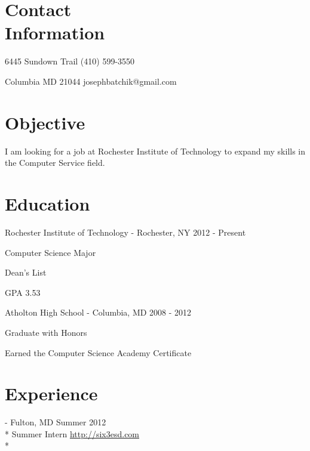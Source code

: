 \documentclass[a4paper,margin,line,11pt]{resume}
\newcommand{\rurl}[1]{\hfill {\footnotesize \url{#1}}}
\newcommand{\rdate}[1]{\hfill {\small #1}}
\renewcommand{\employer}[5]{\item[#1] - #2 \rdate{#3} \\* #4 \rurl{#5} \\*}
\begin{document}
\begin{resume}
\section{\mysidestyle Contact \\ Information} \vspace{2mm}
	\begin{asparablank}
		\item 6445 Sundown Trail \hfill (410) 599-3550
		\item Columbia MD 21044 \hfill josephbatchik@gmail.com
	\end{asparablank}

\section{\mysidestyle Objective}
	 I am looking for a job at Rochester Institute of Technology to expand my skills in the Computer Service field.

\section{\mysidestyle Education}
	\begin{compactdesc}
		\item[Rochester Institute of Technology] - Rochester, NY \rdate{2012 - Present}
		\begin{compactitem} { \small
			\item Computer Science Major
			\item Dean's List
			\item GPA 3.53
		} \end{compactitem}
		\item[Atholton High School] - Columbia, MD \rdate{2008 - 2012}
		\begin{compactitem} { \small
			\item Graduate with Honors
			\item Earned the Computer Science Academy Certificate
		} \end{compactitem}
	\end{compactdesc}

\section{\mysidestyle Experience}
	\begin{asparadesc}
		\employer{Six3 Systems, Inc.}{Fulton, MD}{Summer 2012}{Summer Intern}{http://six3esd.com}


\end{asparadesc}
\end{resume}
\end{document}
